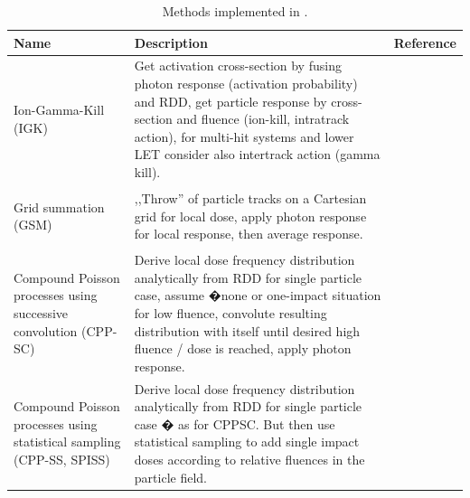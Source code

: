 \begin{table}
\label{tbl:Methods}
\begin{tabular}{m{}m{}m{}}

\hline
\textbf{Name} & \textbf{Description} & \textbf{Reference} \\
\hline

\begin{center}Ion-Gamma-Kill (IGK)\end{center}&
\footnotesize{Get activation cross-section by fusing photon response (activation probability) and RDD, get particle response by cross-section and fluence (ion-kill, intratrack action), for multi-hit systems and lower LET consider also intertrack action (gamma kill).}&
\begin{center}\cite{Waligorski_and_Katz_1980}\end{center}\\

\begin{center}Grid summation (GSM)\end{center}&
\footnotesize{,,Throw'' of particle tracks on a Cartesian grid for local dose, apply photon response for local response, then average response.}&
\begin{center}\cite{Geiss_et_al_1997}\end{center}\\

\begin{center}Compound Poisson processes using successive convolution (CPP-SC)\end{center}&
\footnotesize{Derive local dose frequency distribution analytically from RDD for single particle case, assume �none or one-impact situation for low fluence, convolute resulting distribution with itself until desired high fluence / dose is reached, apply photon response.}&
\begin{center}\cite{Greilich_et_al_CPPSC}\end{center}\\

\begin{center}Compound Poisson processes using statistical sampling (CPP-SS, SPISS)\end{center}&
\footnotesize{Derive local dose frequency distribution analytically from RDD for single particle case � as for CPPSC. But then use statistical sampling to add single impact doses according to relative fluences in the particle field.} &
\begin{center}\cite{Greilich_et_al_CPPSC}\end{center}\\

\hline
\end{tabular}
\caption{Methods implemented in \la{}.}
\end{table}


